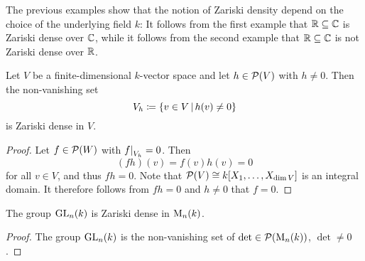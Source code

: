 \begin{warning}
  The previous examples show that the notion of Zariski density depend on the choice of the underlying field $k$:
  It follows from the first example that $\mathbb{R} \subseteq \mathbb{C}$ is Zariski dense over $\mathbb{C}$, while it follows from the second example that $\mathbb{R} \subseteq \mathbb{C}$ is not Zariski dense over $\mathbb{R}$.
\end{warning}


\begin{lemma}
  Let $V$ be a finite-dimensional $k$-vector space and let $h \in \mathcal{P}(V)$ with $h \neq 0$.
  Then the non-vanishing set
  \[
              V_h
    \coloneqq \{
                v \in V
              \suchthat
                h(v) \neq 0
              \}
  \]
  is Zariski dense in $V$.
\end{lemma}
\begin{proof}
  Let $f \in \mathcal{P}(W)$ with $\restrict{f}{V_h} = 0$.
  Then
  \[
      (fh)(v)
    = f(v)h(v)
    = 0
  \]
  for all $v \in V$, and thus $fh = 0$.
  Note that $\mathcal{P}(V) \cong k[X_1, \dotsc, X_{\dim V}]$ is an integral domain.
  It therefore follows from $fh = 0$ and $h \neq 0$ that $f = 0$.
\end{proof}


\begin{corollary}
  \label{corollary: GLn is Zariski dense in Mn}
  The group $\operatorname{GL}_n(k)$ is Zariski dense in $\operatorname{M}_n(k)$.
\end{corollary}
\begin{proof}
  The group $\operatorname{GL}_n(k)$ is the non-vanishing set of $\det \in \mathcal{P}(\operatorname{M}_n(k))$, $\det \neq 0$.
\end{proof}


